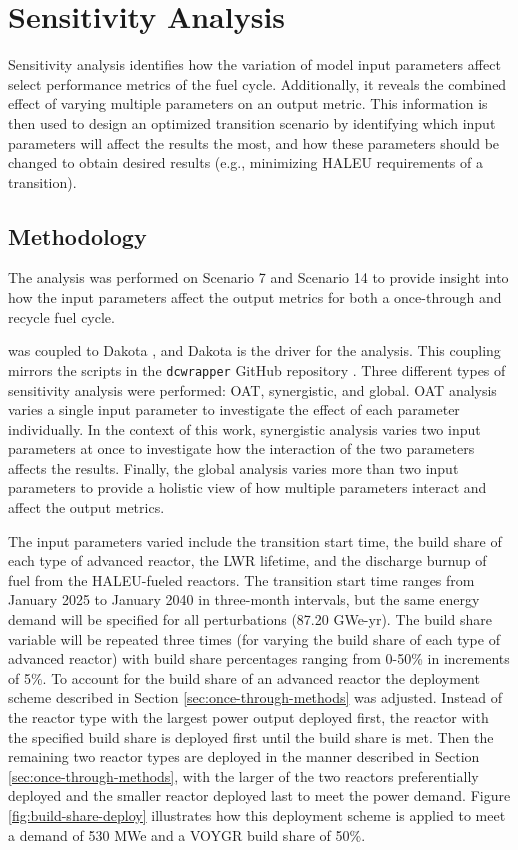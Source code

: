 \section{Sensitivity Analysis}
Sensitivity analysis identifies how the variation of model input
parameters affect select performance 
metrics of the fuel cycle. Additionally, it reveals the combined effect 
of varying multiple parameters on 
an output metric. This information is then used to design 
an optimized transition scenario by identifying which input parameters 
will affect the results the most, and how these parameters should be 
changed to obtain desired results (e.g., minimizing \gls{HALEU} requirements
of a transition). 

\subsection{Methodology}
The analysis was performed on Scenario 7 and Scenario 
14 to provide insight into how the input parameters affect the output 
metrics for both a once-through and recycle fuel cycle. 

\Cyclus was coupled to Dakota \cite{adams_dakota_2019},
and Dakota is the driver for the analysis. This coupling mirrors  
the scripts in the \texttt{dcwrapper} GitHub repository \cite{chee_arfcdcwrapper_2019}.
Three different types 
of sensitivity analysis were performed: \acrfull{OAT}, synergistic, 
and global. \gls{OAT} analysis varies a single input parameter to 
investigate the effect of each parameter individually. In the context of 
this work, synergistic 
analysis varies two input parameters at once to investigate how the 
interaction of the two parameters affects the results. Finally, the global 
analysis varies more than two input parameters to provide a holistic 
view of how multiple parameters interact and affect the output metrics. 

The input parameters varied include the transition 
start time, the build share of each type of advanced reactor, 
the \gls{LWR} lifetime, and the discharge burnup of fuel from the 
\gls{HALEU}-fueled reactors. The transition start time ranges from January 
2025 to January 2040 in three-month intervals, but the same energy demand 
will be specified for all perturbations (87.20 GWe-yr). The build share 
variable will be repeated three times (for varying the build share of each 
type of advanced reactor) with build share percentages ranging from 0-50\% 
in increments of 5\%. To account for the build share of an advanced reactor
the deployment scheme described in Section \ref{sec:once-through-methods}
was adjusted. Instead of the reactor type with the largest power output 
deployed first, the reactor with the specified build share is deployed first 
until the build share is met. Then the remaining two reactor types are 
deployed in the manner described in Section \ref{sec:once-through-methods},
with the larger of the two reactors preferentially deployed and the smaller 
reactor deployed last to meet the power demand. Figure \ref{fig:build-share-deploy}
illustrates how this deployment scheme is applied to meet a demand of 530 
MWe and a VOYGR build share of 50\%. 


